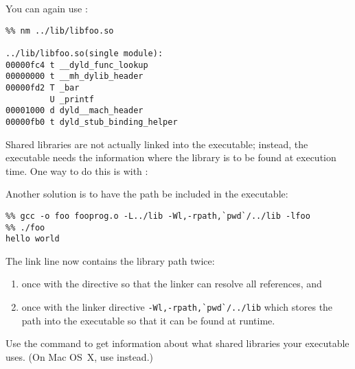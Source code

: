 
You can again use :
\begin{verbatim}
%% nm ../lib/libfoo.so 

../lib/libfoo.so(single module):
00000fc4 t __dyld_func_lookup
00000000 t __mh_dylib_header
00000fd2 T _bar
         U _printf
00001000 d dyld__mach_header
00000fb0 t dyld_stub_binding_helper
\end{verbatim}

Shared libraries are not actually linked into the executable;
instead, the executable needs the information where the library
is to be found at execution time. One way to do this is with
:


Another solution is to have the path be included in the executable:
\begin{verbatim}
%% gcc -o foo fooprog.o -L../lib -Wl,-rpath,`pwd`/../lib -lfoo
%% ./foo
hello world
\end{verbatim}
The link line now contains the library path twice:
\begin{enumerate}
\item once with the  directive so that the linker can resolve
  all references, and
\item once with the linker directive \verb+-Wl,-rpath,`pwd`/../lib+ which
  stores the path into the executable so that it can be found at runtime.
\end{enumerate}

Use the command  to get information about what shared libraries
your executable uses. (On Mac OS~X, use  instead.)


